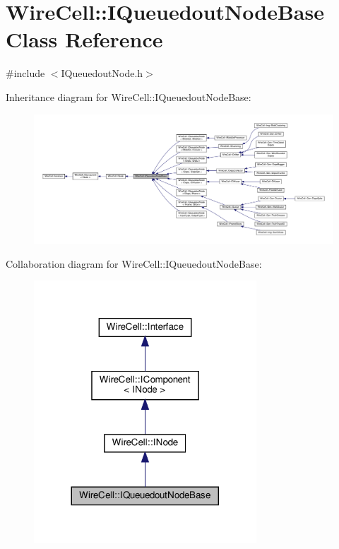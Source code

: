 \hypertarget{class_wire_cell_1_1_i_queuedout_node_base}{}\section{Wire\+Cell\+:\+:I\+Queuedout\+Node\+Base Class Reference}
\label{class_wire_cell_1_1_i_queuedout_node_base}


{\ttfamily \#include $<$I\+Queuedout\+Node.\+h$>$}



Inheritance diagram for Wire\+Cell\+:\+:I\+Queuedout\+Node\+Base\+:
\nopagebreak
\begin{figure}[H]
\begin{center}
\leavevmode
\includegraphics[width=350pt]{class_wire_cell_1_1_i_queuedout_node_base__inherit__graph}
\end{center}
\end{figure}


Collaboration diagram for Wire\+Cell\+:\+:I\+Queuedout\+Node\+Base\+:
\nopagebreak
\begin{figure}[H]
\begin{center}
\leavevmode
\includegraphics[width=236pt]{class_wire_cell_1_1_i_queuedout_node_base__coll__graph}
\end{center}
\end{figure}
